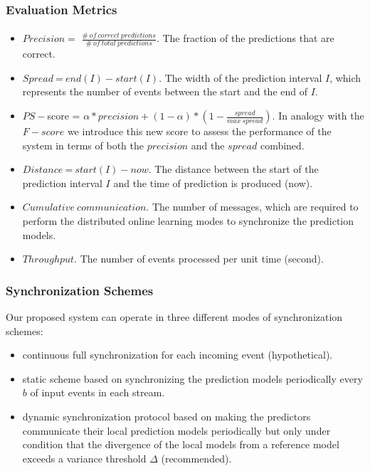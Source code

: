 
\begin{frame}
	
	\frametitle{Evaluation Metrics}
	\framesubtitle{}
	
	\begin{itemize}	
		\item<only@1>  $\mathit{Precision} =$ $ \mathit{\frac{\#\ of\ correct\ predictions}{\#\ of\ total\ predictions}}$. The fraction of the predictions that are correct.     
		\item<only@1> $\mathit{Spread}\ $=$\ end(I) -start(I)$. The width of the prediction interval $I$, which represents the number of events between the start and the end of $I$.
	
		\item<only@1> $\mathit{PS-}$score = $\alpha * precision + (1 - \alpha ) * ( 1- \frac{spread}{max\  spread})$. In analogy with the $F-score$ we introduce this new score to assess the performance of the system in terms of both the $\mathit{precision}$ and the $\mathit{spread}$ combined.
		\item<only@1> $\mathit{Distance}\ $=$\ start(I) - now$. The distance between the start of the prediction interval $I$ and the time of prediction is produced (now). 
		\item<only@2>  $\mathit{Cumulative\ communication}$. The number of messages, which are required to perform the distributed online learning modes to synchronize the prediction models.	
		\item<only@2> $Throughput$. The number of events processed per unit time (second).
	\end{itemize} 
	
\end{frame}


\begin{frame}
	
	\frametitle{Synchronization Schemes }
	
	Our proposed system can operate in three different modes of synchronization schemes: 
	\begin{itemize}	
		\item continuous full synchronization for each incoming event (hypothetical).
		\item static scheme based on synchronizing the prediction models periodically every $b$ of input events in each stream.
		\item dynamic synchronization protocol based on making the predictors communicate their local prediction models periodically but only under condition that the divergence of the local models from a reference model exceeds a variance threshold $\Delta$ (recommended).  	   
		
	\end{itemize} 
	
\end{frame}




